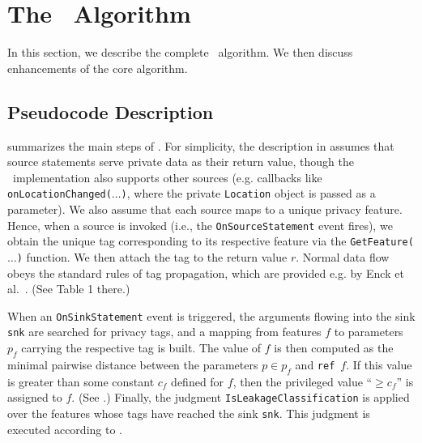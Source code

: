 \section{The \Tool\ Algorithm}\label{Se:bayesalg}

In this section, we describe the complete \Tool\ algorithm. We then discuss enhancements of the core algorithm.

\subsection{Pseudocode Description}\label{Se:pseudo}

 summarizes the main steps of \Tool. For simplicity, the description in  assumes that source statements serve private data as their return value, though the \Tool\ implementation also supports other sources (e.g. callbacks like \texttt{onLocationChanged($\ldots$)}, where the private \texttt{Location} object is passed as a parameter). We also assume that each source maps to a unique privacy feature. Hence, when a source is invoked (i.e., the \texttt{OnSourceStatement} event fires), we obtain the unique tag corresponding to its respective feature via the 
\texttt{GetFeature($\ldots$)} function. We then attach the tag to the return value $r$. Normal data flow obeys the standard rules of tag propagation, which 
are provided e.g. by Enck et al.~\cite{EGCCJMS:OSDI10}. (See Table 1 there.)

When an \texttt{OnSinkStatement} event is triggered, the arguments flowing into the sink \texttt{snk} are searched for privacy tags, and a mapping from features $f$ to parameters $p_f$ carrying the respective tag is built. The value of $f$  is then computed as the minimal pairwise distance between the parameters $p \in p_f$
and {\tt ref}\ $f$. If this value is greater than some constant $c_f$ defined for $f$, then the privileged value ``$\geq c_f$'' is assigned to $f$. (See .) Finally, the judgment \texttt{IsLeakageClassification} is applied over the features whose tags have reached the sink \texttt{snk}. This judgment is executed according to .

